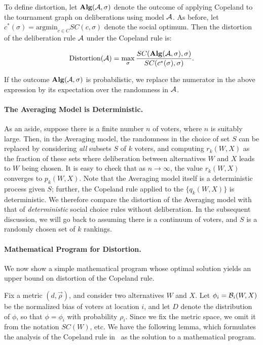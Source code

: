 To define distortion, %
let $\mathbf{Alg}(\mathcal{A},\sigma)$ denote the outcome of applying Copeland to the tournament graph on deliberations using model $\mathcal{A}$. As before, let $c^*(\sigma) = \mbox{argmin}_{c \in C} SC(c,\sigma)$ denote the social optimum. Then the distortion of the deliberation rule $\mathcal{A}$ under the Copeland rule is:

$$\mbox{Distortion}(\mathcal{A}) = \max_{\sigma}  \frac{SC(\mathbf{Alg}(\mathcal{A},\sigma), \sigma)}{SC(c^*(\sigma),\sigma)}.$$

If the outcome $\mathbf{Alg}(\mathcal{A},\sigma)$ is probabilistic, we replace the numerator in the above expression by its expectation over the randomness in $\mathcal{A}$.

\paragraph{The Averaging Model is Deterministic.} As an aside, suppose there is a finite number $n$ of voters, where $n$ is suitably large. Then, in the Averaging model, the randomness in the choice of set $S$ can be replaced by considering {\em all} subsets $S$ of $k$ voters, and computing $r_k(W,X)$ as the fraction of these sets where deliberation between alternatives $W$ and $X$ leads to $W$ being chosen.  It is easy to check that as $n \rightarrow \infty$, the value $r_k(W,X)$ converges to $p_k(W,X)$. Note that the Averaging model itself is a deterministic process given $S$; further, the Copeland rule applied to the $\{q_k(W,X)\}$ is deterministic. We therefore compare the distortion of the Averaging model with that of {\em deterministic} social choice rules without deliberation. In the subsequent discussion, we will go back to assuming there is a continuum of voters, and $S$ is a randomly chosen set of $k$ rankings.

\paragraph{Mathematical Program for Distortion.} We now show a simple mathematical program whose optimal solution yields an upper bound on distortion of the Copeland rule.

Fix a metric $(d ,\vec{\rho})$, and consider two alternatives $W$ and $X$. Let $\phi_i = \mathcal{B}_i(W,X)$ be the normalized bias of voters at location $i$, and let $D$ denote the distribution of $\phi$, so that $\phi = \phi_i$ with probability $\rho_i$. Since we fix the metric space, we omit it from the notation $SC(W)$, etc. We have the following lemma, which formulates the analysis of the Copeland rule in~\cite{AnshelevichBEPS18} as the solution to a mathematical program.

